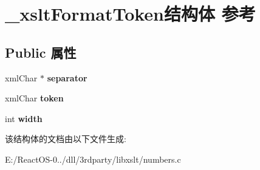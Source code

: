 \hypertarget{struct__xslt_format_token}{}\section{\+\_\+xslt\+Format\+Token结构体 参考}
\label{struct__xslt_format_token}
\subsection*{Public 属性}
\begin{DoxyCompactItemize}
\item 
\mbox{\label{struct__xslt_format_token_a501caa61fc4f2c538737aa70fcabbfd7}} 
xml\+Char $\ast$ {\bfseries separator}
\item 
\mbox{\label{struct__xslt_format_token_aedc7a0b0d1d1446d68112d1e4b5ce334}} 
xml\+Char {\bfseries token}
\item 
\mbox{\label{struct__xslt_format_token_ace86629a382e44c17371180a656fb0ad}} 
int {\bfseries width}
\end{DoxyCompactItemize}


该结构体的文档由以下文件生成\+:\begin{DoxyCompactItemize}
\item 
E\+:/\+React\+O\+S-\/0../dll/3rdparty/libxslt/numbers.\+c\end{DoxyCompactItemize}
